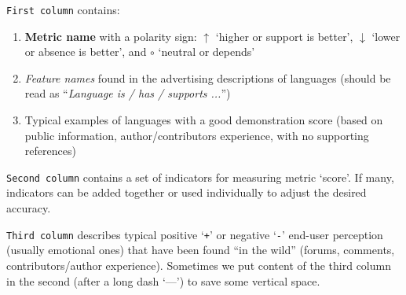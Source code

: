\documentclass[11pt]{article}
\begin{document}
\smallskip

\noindent\texttt{First column} contains:

\vspace{-5pt}
\begin{enumerate}
    \setlength\itemsep{-3pt}
    \item \textbf{Metric name} with a polarity sign: $\uparrow$ `higher or support is better', $\downarrow$ `lower or absence is better', and $\circ$ `neutral or depends'
    \item \textit{Feature names} found in the advertising descriptions of languages (should be read as ``\textit{Language is / has / supports ...}'')
    \item \textcolor{gray!90}{Typical examples} of languages with a good demonstration score (based on public information, author/contributors experience, with no supporting references)
\end{enumerate}
\vspace{-5pt}

\noindent\texttt{Second column} contains a set of indicators for measuring metric `score'. If many, indicators can be added together or used individually to adjust the desired accuracy.

\smallskip

\noindent\texttt{Third column} describes typical positive `\texttt{+}' or negative `\texttt{-}' end-user perception (usually emotional ones) that have been found ``in the wild'' (forums, comments, contributors/author experience). Sometimes we put content of the third column in the second (after a long dash `---') to save some vertical space.

\restoregeometry

\newcommand{\cnt}{\stepcounter{ccnt}\the\value{ccnt}.}
\newcommand{\gray}[1]{\textcolor{gray!70}{\scriptsize#1}}
\newcommand{\high}{$\uparrow$}
\newcommand{\low}{$\downarrow$}
\newcommand{\llow}{$^\downarrow$}
\newcommand{\hhigh}{$^\uparrow$}
\newcommand{\mmid}{$^\circ$}
\newcommand{\indicator}{\mbox{$\blacktriangleright$}~}  
\newcommand{\commentp}{\texttt{+}~}
\newcommand{\commentn}{\texttt{-}~}

\newcommand{\metriccategory}[1]{
    \multicolumn{3}{p{\textwidth+30pt}}{\cellcolor{gray!12}\linebreak\centering\textbf{#1}\tiny\linebreak}
}
\newcommand{\ruler}{\noindent {\color{red} \rule{\linewidth}{0.5mm}}}
\setlength{\tabcolsep}{4pt}
\setlength{\arrayrulewidth}{.15ex} %
\setlength\LTleft{-20pt} %
\setlength\LTright{-20pt} %
\footnotesize
\end{document}
